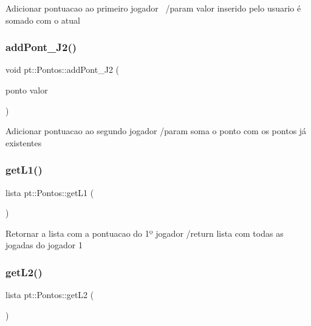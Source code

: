 Adicionar pontuacao ao primeiro jogador~\newline
/param valor inserido pelo usuario é somado com o atual \mbox{\label{structpt_1_1Pontos_a49bb0ea578b5fd6ac6204dd87a1dc52b}} 
\subsubsection{\texorpdfstring{add\+Pont\+\_\+\+J2()}{addPont\_J2()}}
{\footnotesize\ttfamily void pt\+::\+Pontos\+::add\+Pont\+\_\+\+J2 (\begin{DoxyParamCaption}\item[{ponto}]{valor }\end{DoxyParamCaption})\hspace{0.3cm}{\ttfamily [inline]}}

Adicionar pontuacao ao segundo jogador /param soma o ponto com os pontos já existentes \mbox{\label{structpt_1_1Pontos_a284d70287fc19c3f896af99390c59f85}} 
\subsubsection{\texorpdfstring{get\+L1()}{getL1()}}
{\footnotesize\ttfamily lista pt\+::\+Pontos\+::get\+L1 (\begin{DoxyParamCaption}{ }\end{DoxyParamCaption})\hspace{0.3cm}{\ttfamily [inline]}}

Retornar a lista com a pontuacao do 1º jogador /return lista com todas as jogadas do jogador 1 \mbox{\label{structpt_1_1Pontos_a5e8742cc6ba9a50ab35118e6a0f435d5}} 
\subsubsection{\texorpdfstring{get\+L2()}{getL2()}}
{\footnotesize\ttfamily lista pt\+::\+Pontos\+::get\+L2 (\begin{DoxyParamCaption}{ }\end{DoxyParamCaption})\hspace{0.3cm}{\ttfamily [inline]}}

